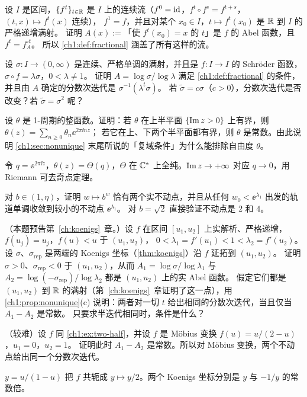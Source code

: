 \begin{exercise}\label{ch1:ex:flow-to-abel}
设 $I$ 是区间，$\{f^t\}_{t\in\mathbb{R}}$ 是 $I$ 上的连续流（$f^0=\mathrm{id}$，$f^t\circ f^s=f^{t+s}$，$(t,x)\mapsto f^t(x)$ 连续），
$f^1=f$，并且对某个 $x_0\in I$，$t\mapsto f^t(x_0)$ 是 $\mathbb{R}$ 到 $I$ 的严格递增满射。
证明 $A(x):=$「使 $f^t(x_0)=x$ 的 $t$」是 $f$ 的 Abel 函数，且 $f^t=f_A^{\circ t}$。
所以 \cref{ch1:def:fractional} 涵盖了所有这样的流。
\end{exercise}

\begin{exercise}
设 $\sigma:I\to(0,\infty)$ 是连续、严格单调的满射，并且是 $f:I\to I$ 的 Schröder 函数，$\sigma\circ f=\lambda\sigma$，$0<\lambda\ne1$。
证明 $A=\log\sigma/\log\lambda$ 满足 \cref{ch1:def:fractional} 的条件，并且由 $A$ 确定的分数次迭代是 $\sigma^{-1}(\lambda^t\sigma)$。
若 $\tilde\sigma=c\sigma$（$c>0$），分数次迭代是否改变？若 $\tilde\sigma=\sigma^2$ 呢？
\end{exercise}

\begin{exercise}\label{ch1:ex:liouville}
设 $\theta$ 是 1-周期的整函数。证明：若 $\theta$ 在上半平面 $\{\operatorname{Im} z>0\}$ 上有界，则 $\theta(z)=\sum_{n\ge0}\theta_n\ee^{2\pi\ii nz}$；
若它在上、下两个半平面都有界，则 $\theta$ 是常数。由此说明 \cref{ch1:sec:nonunique} 末尾所说的「复域条件」为什么能排除自由度 $\theta$。
\end{exercise}
\begin{hint}
令 $q=\ee^{2\pi\ii z}$，$\theta(z)=\Theta(q)$，$\Theta$ 在 $\mathbb{C}^*$ 上全纯。$\operatorname{Im} z\to+\infty$ 对应 $q\to0$，用 Riemann 可去奇点定理。
\end{hint}

\begin{exercise}
对 $b\in(1,\eta)$，证明 $w\mapsto b^w$ 恰有两个实不动点，并且从任何 $w_0<\ee^{\lambda_1}$ 出发的轨道单调收敛到较小的不动点 $\ee^{\lambda_1}$。
对 $b=\sqrt2$ 直接验证不动点是 $2$ 和 $4$。
\end{exercise}

\begin{exercise}\label{ch1:ex:two-half}
（本题预告第~\ref{ch:koenigs}~章。）设 $f$ 在区间 $[u_1,u_2]$ 上实解析、严格递增，$f(u_j)=u_j$，$f(u)<u$ 于 $(u_1,u_2)$，
$0<\lambda_1=f'(u_1)<1<\lambda_2=f'(u_2)$。设 $\sigma$、$\sigma_{\mathrm{rep}}$ 是两端的 Koenigs 坐标（\cref{thm:koenigs}）沿 $f$ 延拓到 $(u_1,u_2)$。
证明 $\sigma>0$、$\sigma_{\mathrm{rep}}<0$ 于 $(u_1,u_2)$，从而 $A_1=\log\sigma/\log\lambda_1$ 与 $A_2=\log(-\sigma_{\mathrm{rep}})/\log\lambda_2$ 都是 $(u_1,u_2)$ 上的实 Abel 函数。
假定它们都是 $(u_1,u_2)$ 到 $\mathbb{R}$ 的满射（第~\ref{ch:koenigs}~章证明了这一点），用 \cref{ch1:prop:nonunique}(c) 说明：两者对一切 $t$ 给出相同的分数次迭代，当且仅当 $A_1-A_2$ 是常数。
只要求半迭代相同时，条件是什么？
\end{exercise}

\begin{exercise}
（较难）设 $f$ 同 \cref{ch1:ex:two-half}，并设 $f$ 是 Möbius 变换 $f(u)=u/(2-u)$，$u_1=0$，$u_2=1$。
证明此时 $A_1-A_2$ 是常数。所以对 Möbius 变换，两个不动点给出同一个分数次迭代。
\end{exercise}
\begin{hint}
$y=u/(1-u)$ 把 $f$ 共轭成 $y\mapsto y/2$。两个 Koenigs 坐标分别是 $y$ 与 $-1/y$ 的常数倍。
\end{hint}
